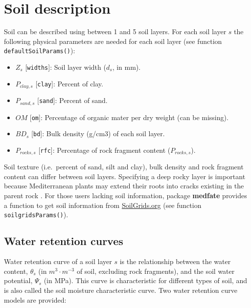 \documentclass[]{book}
\providecommand{\tightlist}{%
  \setlength{\itemsep}{0pt}\setlength{\parskip}{0pt}}
\begin{document}
\hypertarget{soil-description}{%
\section{Soil description}\label{soil-description}}

Soil can be described using between 1 and 5 soil layers. For each soil layer \(s\) the following physical parameters are needed for each soil layer (see function \texttt{defaultSoilParams()}):

\begin{itemize}
\tightlist
\item
  \(Z_{s}\) {[}\texttt{widths}{]}: Soil layer width (\(d_s\), in mm).
\item
  \(P_{clay,s}\) {[}\texttt{clay}{]}: Percent of clay.
\item
  \(P_{sand,s}\) {[}\texttt{sand}{]}: Percent of sand.
\item
  \(OM\) {[}\texttt{om}{]}: Percentage of organic mater per dry weight (can be missing).
\item
  \(BD_{s}\) {[}\texttt{bd}{]}: Bulk density (g/cm3) of each soil layer.
\item
  \(P_{rocks,s}\) {[}\texttt{rfc}{]}: Percentage of rock fragment content (\(P_{rocks,s}\)).
\end{itemize}

Soil texture (i.e.~percent of sand, silt and clay), bulk density and rock fragment content can differ between soil layers. Specifying a deep rocky layer is important because Mediterranean plants may extend their roots into cracks existing in the parent rock \citep{Ruffault2013}. For those users lacking soil information, package \textbf{medfate} provides a function to get soil information from \href{https://soilgrids.org/}{SoilGrids.org} (see function \texttt{soilgridsParams()}).

\hypertarget{water-retention-curves}{%
\subsection{Water retention curves}\label{water-retention-curves}}

Water retention curve of a soil layer \(s\) is the relationship between the water content, \(\theta_s\) (in \(m^3 \cdot m^{-3}\) of soil, excluding rock fragments), and the soil water potential, \(\Psi_s\) (in MPa). This curve is characteristic for different types of soil, and is also called the soil moisture characteristic curve. Two water retention curve models are provided:
\end{document}
